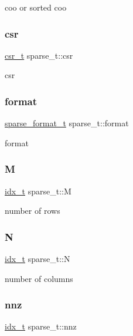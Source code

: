 coo or sorted coo \mbox{\label{structsparse__t_a68a71613181b0380d0d4d871236b2521}} 
\subsubsection{\texorpdfstring{csr}{csr}}
{\footnotesize\ttfamily \hyperlink{structcsr__t}{csr\+\_\+t} sparse\+\_\+t\+::csr}

csr \mbox{\label{structsparse__t_a1bb9e61c965f9ea814aab21f7ff77a73}} 
\subsubsection{\texorpdfstring{format}{format}}
{\footnotesize\ttfamily \hyperlink{spmv_8cc_a8c0094893526c01b430903b2d9227256}{sparse\+\_\+format\+\_\+t} sparse\+\_\+t\+::format}

format \mbox{\label{structsparse__t_a8a08bd7a16c76180afccf05e28f72a93}} 
\subsubsection{\texorpdfstring{M}{M}}
{\footnotesize\ttfamily \hyperlink{spmv_8cc_a8e93478a00e685bea5e6a3f617bf03a3}{idx\+\_\+t} sparse\+\_\+t\+::M}

number of rows \mbox{\label{structsparse__t_a418c6deef17a60f31ff11182ea94f85a}} 
\subsubsection{\texorpdfstring{N}{N}}
{\footnotesize\ttfamily \hyperlink{spmv_8cc_a8e93478a00e685bea5e6a3f617bf03a3}{idx\+\_\+t} sparse\+\_\+t\+::N}

number of columns \mbox{\label{structsparse__t_ae982d138f3904323b65975769b045a3f}} 
\subsubsection{\texorpdfstring{nnz}{nnz}}
{\footnotesize\ttfamily \hyperlink{spmv_8cc_a8e93478a00e685bea5e6a3f617bf03a3}{idx\+\_\+t} sparse\+\_\+t\+::nnz}

